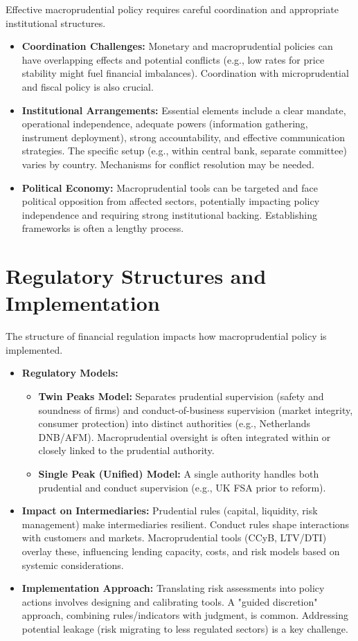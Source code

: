 Effective macroprudential policy requires careful coordination and appropriate institutional structures.
\begin{itemize}
    \item \textbf{Coordination Challenges:} Monetary and macroprudential policies can have overlapping effects and potential conflicts (e.g., low rates for price stability might fuel financial imbalances). Coordination with microprudential and fiscal policy is also crucial.
    \item \textbf{Institutional Arrangements:} Essential elements include a clear mandate, operational independence, adequate powers (information gathering, instrument deployment), strong accountability, and effective communication strategies. The specific setup (e.g., within central bank, separate committee) varies by country. Mechanisms for conflict resolution may be needed.
    \item \textbf{Political Economy:} Macroprudential tools can be targeted and face political opposition from affected sectors, potentially impacting policy independence and requiring strong institutional backing. Establishing frameworks is often a lengthy process.
\end{itemize}

\section{Regulatory Structures and Implementation}

The structure of financial regulation impacts how macroprudential policy is implemented.
\begin{itemize}
    \item \textbf{Regulatory Models:}
        \begin{itemize}
            \item \textbf{Twin Peaks Model:} Separates prudential supervision (safety and soundness of firms) and conduct-of-business supervision (market integrity, consumer protection) into distinct authorities (e.g., Netherlands DNB/AFM). Macroprudential oversight is often integrated within or closely linked to the prudential authority.
            \item \textbf{Single Peak (Unified) Model:} A single authority handles both prudential and conduct supervision (e.g., UK FSA prior to reform).
        \end{itemize}
    \item \textbf{Impact on Intermediaries:} Prudential rules (capital, liquidity, risk management) make intermediaries resilient. Conduct rules shape interactions with customers and markets. Macroprudential tools (CCyB, LTV/DTI) overlay these, influencing lending capacity, costs, and risk models based on systemic considerations.
    \item \textbf{Implementation Approach:} Translating risk assessments into policy actions involves designing and calibrating tools. A "guided discretion" approach, combining rules/indicators with judgment, is common. Addressing potential leakage (risk migrating to less regulated sectors) is a key challenge.
\end{itemize}

